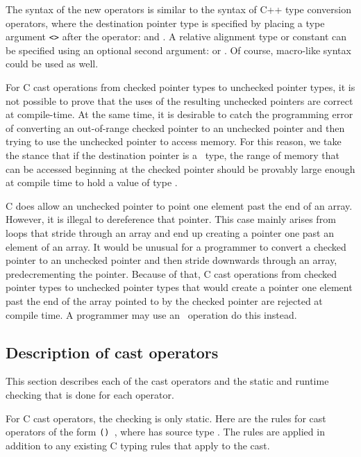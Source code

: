 The syntax of the new operators is similar to the syntax of C++ type
conversion operators, where the destination pointer type is specified by
placing a type argument \texttt{<>} after the operator: 
and .   A relative alignment type or constant can be
specified using an optional second argument:  
 or .
Of course, macro-like syntax could be used as well.

For C cast operations from checked pointer types to unchecked pointer types,
it is not possible to prove that the uses of the resulting unchecked pointers
are correct at compile-time.   At the same
time, it is desirable to  catch the programming error of converting an out-of-range
checked pointer to an unchecked pointer and then trying to use the unchecked
pointer to access memory.  For this reason, we take the stance that if the
destination pointer is a \uncheckedptrT\ type, the range of memory that can be accessed
beginning at the checked pointer should be provably large enough at compile time
to hold a value of type .

C does allow an unchecked pointer to point one element past the end of an array.
However, it is illegal to dereference that pointer.  This case mainly arises
from loops that stride through an array and end up creating a pointer one past
an element of an array.  It would be unusual for a programmer to
convert a checked pointer to an unchecked pointer and then stride downwards through an array,
predecrementing the pointer.  Because of that, C cast operations from checked pointer
types to unchecked pointer types that would create a pointer one element past
the end of the array pointed to by the checked pointer are rejected at compile time.
A programmer may use an \assumeboundscast\ operation do this instead.

\subsection{Description of cast operators}

This section describes each of the cast operators and the static
and runtime checking that is done for each operator.   

For C cast operators, the checking is only static.
Here are the rules for cast operators of the form \texttt{() },
where  has source type .  The rules are applied in addition
to any existing C typing rules that apply to the cast.

